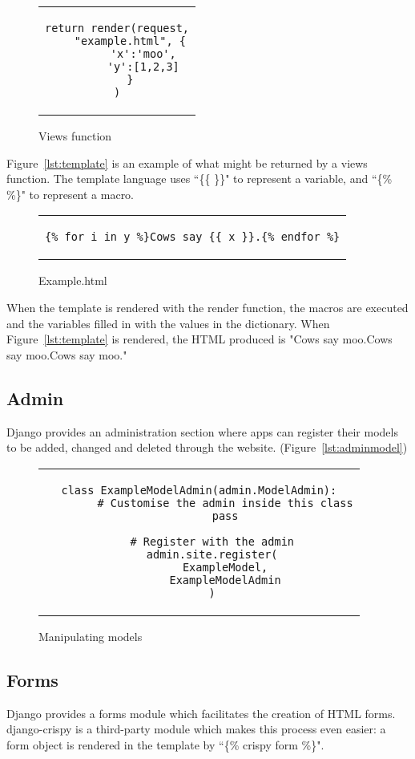 \begin{figure}[thp]
	\centering
	\begin{tabular}{c}
	\begin{lstlisting}[label={lst:views}]
return render(request,
	"example.html", {
		'x':'moo',
		'y':[1,2,3]
	}
)
	\end{lstlisting}
	\end{tabular}
	\caption{Views function}
\end{figure}

Figure~\ref{lst:template} is an example of what might be returned by a views function. The template language uses ``\{\{ \}\}" to represent a variable, and ``\{\% \%\}" to represent a macro.

\begin{figure}[thp]
	\centering
	\begin{tabular}{c}
	\begin{lstlisting}[label={lst:template}]
	{% for i in y %}Cows say {{ x }}.{% endfor %}
	\end{lstlisting}
	\end{tabular}
	\caption{Example.html}
\end{figure}

When the template is rendered with the render function, the macros are executed and the variables filled in with the values in the dictionary. When Figure~\ref{lst:template} is rendered, the HTML produced is "Cows say moo.Cows say moo.Cows say moo."

\subsection{Admin}
Django provides an administration section where apps can register their models to be added, changed and deleted through the website. (Figure~\ref{lst:adminmodel})

\begin{figure}[thp]
	\centering
	\begin{tabular}{c}
	\begin{lstlisting}[label={lst:adminmodel}]
	class ExampleModelAdmin(admin.ModelAdmin):
		# Customise the admin inside this class
		pass
		
	# Register with the admin
	admin.site.register(
		ExampleModel,
		ExampleModelAdmin
	)
	\end{lstlisting}
	\end{tabular}
	\caption{Manipulating models}
\end{figure}

\subsection{Forms}
Django provides a forms module which facilitates the creation of HTML forms. django-crispy is a third-party module which makes this process even easier: a form object is rendered in the template by ``\{\% crispy form \%\}".

